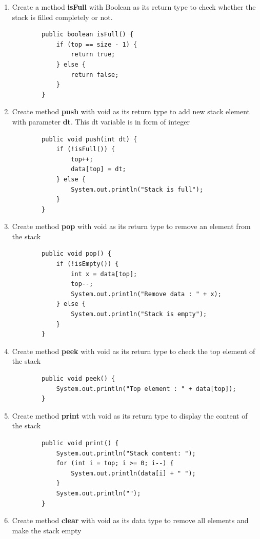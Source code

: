 \documentclass[12pt,titlepage]{article}
\begin{document}
\begin{enumerate}
    \item Create a method \textbf{isFull} with Boolean as its return type to check whether the stack is filled completely or not.
    \begin{verbatim}
        public boolean isFull() {
            if (top == size - 1) {
                return true;
            } else {
                return false;
            }
        }
    \end{verbatim}
    \item Create method \textbf{push} with void as its return type to add new stack element with parameter \textbf{dt}. This dt variable is in form of integer
    \begin{verbatim}
        public void push(int dt) {
            if (!isFull()) {
                top++;
                data[top] = dt;
            } else {
                System.out.println("Stack is full");
            }
        }
    \end{verbatim}
    \item Create method \textbf{pop} with void as its return type to remove an element from the stack
    \begin{verbatim}
        public void pop() {
            if (!isEmpty()) {
                int x = data[top];
                top--;
                System.out.println("Remove data : " + x);
            } else {
                System.out.println("Stack is empty");
            }
        }
    \end{verbatim}
    \item Create method \textbf{peek} with void as its return type to check the top element of the stack
    \begin{verbatim}
        public void peek() {
            System.out.println("Top element : " + data[top]);
        }
    \end{verbatim}
    \item Create method \textbf{print} with void as its return type to display the content of the stack
    \begin{verbatim}
        public void print() {
            System.out.println("Stack content: ");
            for (int i = top; i >= 0; i--) {
                System.out.println(data[i] + " ");
            }
            System.out.println("");
        }
    \end{verbatim}
    \item Create method \textbf{clear} with void as its data type to remove all elements and make the stack empty

\end{enumerate}
\end{document}
